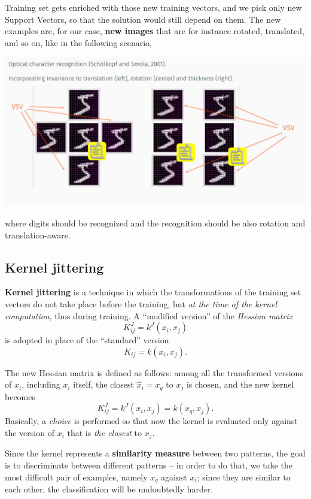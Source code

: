 \documentclass[10pt]{report}
\begin{document}
Training set gets enriched with those new training vectors, and we pick only new
Support Vectors, so that the solution would still depend on them. The new
examples are, for our case, \textbf{new images} that are for instance rotated,
translated, and so on, like in the following scenario,

\begin{center}
\includegraphics[width=.9\linewidth]{./pics/svm/vsv-2.jpg}
\end{center}

where digits should be recognized and the recognition should be also rotation\-
and translation\--aware.

\subsection{Kernel jittering}
\label{sec:orgc158caa}

\textbf{Kernel jittering} is a technique in which the transformations of the training
 set vectors do not take place before the training, but \emph{at the time of the
 kernel computation}, thus during training. A ``modified version'' of the
 \emph{Hessian matrix} $$K^J_{ij} = k^J(x_i, x_j)$$ is adopted in place of the
 ``standard'' version $$K_{ij} = k(x_i, x_j).$$

The new Hessian matrix is defined as follows: among all the transformed
versions of \(x_i\), including \(x_i\) itself, the closest \(\hat{x}_i = x_q\) to
\(x_j\) is chosen, and the new kernel becomes
$$K^J_{ij} = k^J(x_i, x_j) = k(x_q, x_j).$$ Basically, a \emph{choice} is performed
so that now the kernel is evaluated only against the version of \(x_i\) that is
\emph{the closest} to \(x_j\).

Since the kernel represents a \textbf{similarity measure} between two patterns, the
goal is to discriminate between different patterns -- in order to do that, we
take the most difficult pair of examples, namely \(x_q\) against \(x_i\); since
they are similar to each other, the classification will be undoubtedly harder.
\end{document}
